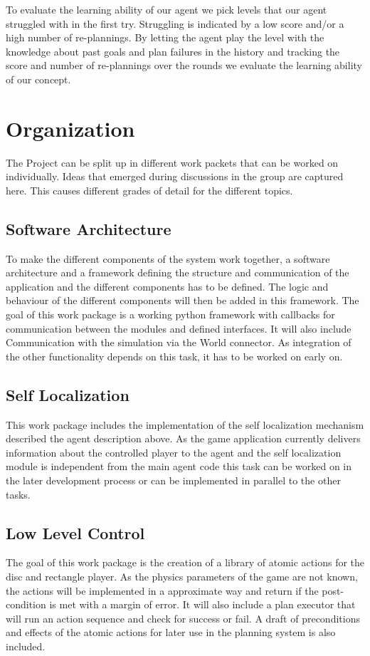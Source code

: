 \documentclass{article}
\begin{document}
To evaluate the learning ability of our agent we pick levels that our agent struggled with in the first try. Struggling is indicated by a low score and/or a high number of re-plannings. By letting the agent play the level with the knowledge about past goals and plan failures in the history and tracking the score and number of re-plannings over the rounds we evaluate the learning ability of our concept.

\section{Organization}

The Project can be split up in different work packets that can be worked on individually.
Ideas that emerged during discussions in the group are captured here. This causes different grades of detail for the different topics.

\subsection{Software Architecture}
To make the different components of the system work together, a software architecture and a framework defining the structure and communication of the application and the different components has to be defined. 
The logic and behaviour of the different components will then be added in this framework. 
The goal of this work package is a working python framework with callbacks for communication between the modules and defined interfaces. 
It will also include Communication with the simulation via the World connector.
As integration of the other functionality depends on this task, it has to be worked on early on.

\subsection{Self Localization}

This work package includes the implementation of the self localization mechanism described the agent description above. As the game application currently delivers information about the controlled player to the agent and the self localization module is independent from the main agent code this task can be worked on in the later development process or can be implemented in parallel to the other tasks. 

\subsection{Low Level Control}
The goal of this work package is the creation of a library of atomic actions for the disc and rectangle player. 
As the physics parameters of the game are not known, the actions will be implemented in a approximate way and return if the post-condition is met with a margin of error. 
It will also include a plan executor that will run an action sequence and check for success or fail.
A draft of preconditions and effects of the atomic actions for later use in the planning system is also included.
\end{document}
